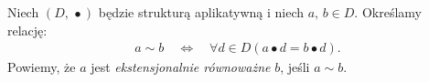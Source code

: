 
\begin{definicja}%
Niech \((D,\,\bullet)\) będzie strukturą aplikatywną i niech \(a,\,b\in D\). Określamy relację: 
\begin{align*}
a \sim b \quad \Leftrightarrow\quad \forall d \in D \left(a \bullet d = b \bullet d\right).
\end{align*}
Powiemy, że \(a\) jest \emph{ekstensjonalnie równoważne} \(b\), jeśli \(a\sim b\).
\end{definicja}

